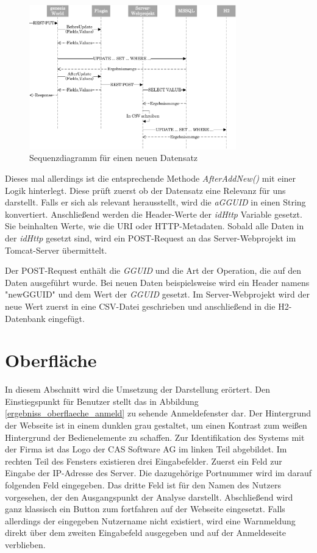 \begin{figure}[htbp]
\centering
  \includegraphics[width=0.8\textwidth]{pics/sequenzdiagramm.pdf}
\caption{Sequenzdiagramm für einen neuen Datensatz}
\label{umsetzung_sequenz}
\end{figure}

Dieses mal allerdings ist die entsprechende Methode \textit{AfterAddNew()} mit einer Logik hinterlegt. Diese prüft zuerst ob der Datensatz eine Relevanz für uns darstellt. Falls er sich als relevant herausstellt, wird die \textit{aGGUID} in einen String konvertiert. Anschließend werden die Header-Werte der \textit{idHttp} Variable gesetzt. Sie beinhalten Werte, wie die URI oder HTTP-Metadaten. Sobald alle Daten in der \textit{idHttp} gesetzt sind, wird ein POST-Request an das Server-Webprojekt im Tomcat-Server übermittelt. 

Der POST-Request enthält die \textit{GGUID} und die Art der Operation, die auf den Daten ausgeführt wurde. Bei neuen Daten beispielsweise wird ein Header namens "newGGUID" und dem Wert der \textit{GGUID} gesetzt. Im Server-Webprojekt wird der neue Wert zuerst in eine CSV-Datei geschrieben und anschließend in die H2-Datenbank eingefügt.


\section{Oberfläche}

In diesem Abschnitt wird die Umsetzung der Darstellung erörtert. Den Einstiegspunkt für Benutzer stellt das in Abbildung \ref{ergebniss_oberflaeche_anmeld} zu sehende Anmeldefenster dar. Der Hintergrund der Webseite ist in einem dunklen grau gestaltet, um einen Kontrast zum weißen Hintergrund der Bedienelemente zu schaffen. Zur Identifikation des Systems mit der Firma ist das Logo der CAS Software AG im linken Teil abgebildet. Im rechten Teil des Fensters existieren drei Eingabefelder. Zuerst ein Feld zur Eingabe der IP-Adresse des Server. Die dazugehörige Portnummer wird im darauf folgenden Feld eingegeben. Das dritte Feld ist für den Namen des Nutzers vorgesehen, der den Ausgangspunkt der Analyse darstellt. Abschließend wird ganz klassisch ein Button zum fortfahren auf der Webseite eingesetzt. Falls allerdings der eingegeben Nutzername nicht existiert, wird eine Warnmeldung direkt über dem zweiten Eingabefeld ausgegeben und auf der Anmeldeseite verblieben. 

